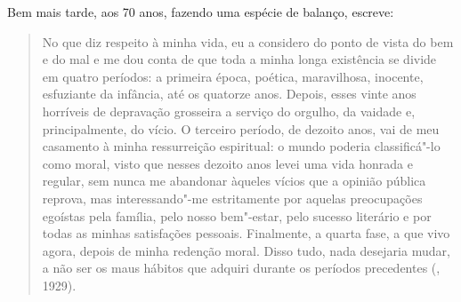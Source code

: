 Bem mais tarde, aos 70 anos, fazendo uma espécie de balanço, escreve:

\begin{quotation}
No que diz respeito à minha vida, eu a considero do ponto de vista do
bem e do mal e me dou conta de que toda a minha longa
existência se divide em quatro períodos: a primeira época, poética,
maravilhosa, inocente, esfuziante da infância, até os quatorze anos.
Depois, esses vinte anos horríveis de depravação grosseira a serviço do
orgulho, da vaidade e, principalmente, do vício. O terceiro período, de
dezoito anos, vai de meu casamento à minha ressurreição espiritual: o
mundo poderia classificá"-lo como moral, visto que nesses dezoito anos
levei uma vida honrada e regular, sem nunca me abandonar àqueles vícios
que a opinião pública reprova, mas interessando"-me estritamente por
aquelas preocupações egoístas pela família, pelo nosso bem"-estar, pelo
sucesso literário e por todas as minhas satisfações pessoais. Finalmente,
a quarta fase, a que vivo agora, depois de minha redenção moral. Disso
tudo, nada desejaria mudar, a não ser os maus hábitos que adquiri
durante os períodos precedentes (, 1929). 
\end{quotation}

